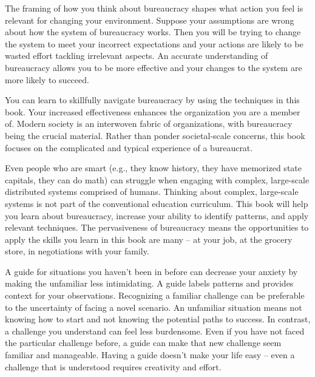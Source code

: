 The framing of how you think about bureaucracy shapes what action you feel is relevant for changing your environment. 
Suppose your assumptions are wrong about how the system of bureaucracy works. Then you will be trying to change the system to meet your incorrect expectations and your actions are likely to be wasted effort tackling irrelevant aspects. 
An accurate understanding of bureaucracy allows you to be more effective and your changes to the system are more likely to succeed. 



You can learn to skillfully navigate bureaucracy by using the techniques in this book. 
Your increased effectiveness enhances the organization you are a member of. Modern society is an interwoven fabric of organizations, with  bureaucracy being the crucial material.
Rather than ponder societal-scale concerns, this book focuses on the complicated and typical experience of a bureaucrat. 

Even people who are smart (e.g., they know history, they have memorized state capitals, they can do math) can struggle when engaging with complex, large-scale distributed systems comprised of humans. Thinking about complex, large-scale systems is not part of the conventional education curriculum. This book will help you learn about bureaucracy, increase your ability to identify patterns, and apply relevant techniques. The pervasiveness of bureaucracy means the opportunities to apply the skills you learn in this book are many -- at your job, at the grocery store, in negotiations with your family.

A guide for situations you haven't been in before can decrease your anxiety by making the unfamiliar less intimidating. 
A guide labels patterns and provides context for your observations. 
Recognizing a familiar challenge can be preferable to the uncertainty of facing a novel scenario. An unfamiliar situation means not knowing how to start and not knowing the potential paths to success. In contrast, a challenge you understand can feel less burdensome. 
Even if you have not faced the particular challenge before, a guide can make that new challenge seem familiar and manageable. 
Having a guide doesn't make your life easy -- even a challenge that is understood requires creativity and effort.



